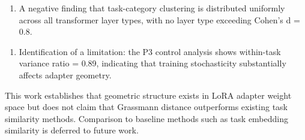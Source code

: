 \begin{enumerate}
\item A negative finding that task-category clustering is distributed uniformly across all transformer layer types, with no layer type exceeding Cohen's d = 0.8.
\end{enumerate}

\begin{enumerate}
\item Identification of a limitation: the P3 control analysis shows within-task variance ratio = 0.89, indicating that training stochasticity substantially affects adapter geometry.
\end{enumerate}

This work establishes that geometric structure exists in LoRA adapter weight space but does not claim that Grassmann distance outperforms existing task similarity methods. Comparison to baseline methods such as task embedding similarity is deferred to future work.
